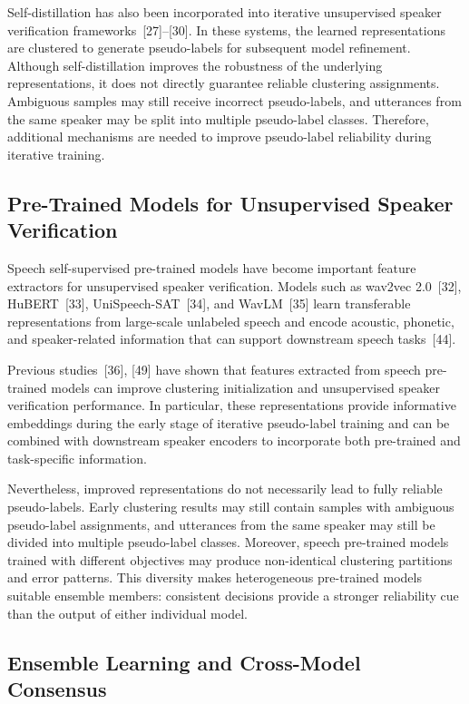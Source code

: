 \documentclass[journal]{IEEEtran}
\begin{document}
Self-distillation has also been incorporated into iterative
unsupervised speaker verification frameworks~[27]--[30]. In these
systems, the learned representations are clustered to generate
pseudo-labels for subsequent model refinement. Although
self-distillation improves the robustness of the underlying
representations, it does not directly guarantee reliable clustering
assignments. Ambiguous samples may still receive incorrect
pseudo-labels, and utterances from the same speaker may be split into
multiple pseudo-label classes. Therefore, additional mechanisms are
needed to improve pseudo-label reliability during iterative training.

\subsection{Pre-Trained Models for Unsupervised Speaker Verification}

Speech self-supervised pre-trained models have become important
feature extractors for unsupervised speaker verification. Models such
as wav2vec 2.0~[32], HuBERT~[33], UniSpeech-SAT~[34], and
WavLM~[35] learn transferable representations from large-scale
unlabeled speech and encode acoustic, phonetic, and speaker-related
information that can support downstream speech tasks~[44].

Previous studies~[36], [49] have shown that features extracted from
speech pre-trained models can improve clustering initialization and
unsupervised speaker verification performance. In particular, these
representations provide informative embeddings during the early stage
of iterative pseudo-label training and can be combined with
downstream speaker encoders to incorporate both pre-trained and
task-specific information.

Nevertheless, improved representations do not necessarily lead to
fully reliable pseudo-labels. Early clustering results may still
contain samples with ambiguous pseudo-label assignments, and utterances from the same speaker
may still be divided into multiple pseudo-label classes. Moreover,
speech pre-trained models trained with different objectives may
produce non-identical clustering partitions and error patterns. This
diversity makes heterogeneous pre-trained models suitable ensemble
members: consistent decisions provide a stronger reliability cue than
the output of either individual model.

\subsection{Ensemble Learning and Cross-Model Consensus}
\end{document}
